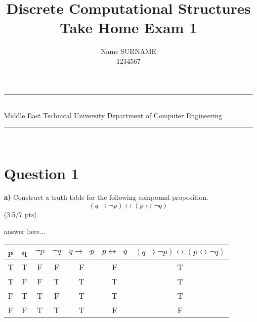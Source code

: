 \documentclass[a4paper,12pt]{article}
\title{Discrete Computational Structures \\ Take Home Exam 1}
\author{Name SURNAME \\ 1234567} %
\date{} %
\newcommand{\HRule}{\rule{\linewidth}{1mm}}
\newcommand\tab[1][1cm]{\hspace*{#1}}
\begin{document}
\HRule\\
Middle East Technical University \hfill Department of Computer Engineering
{\let\newpage\relax\maketitle}
\HRule\\
\vspace{1cm}


\section*{Question 1 \hfill {}}

\tab \textbf{a)} Construct a truth table for the following compound proposition.
\begin{equation*}
    (q \rightarrow \neg p)\leftrightarrow (p \leftrightarrow \neg q)
\end{equation*} 
\hfill \small{(3.5/7 pts)} \\
\begin{tcolorbox}
answer here...\\
\begin{tabular}{|l|c|c|c|c|c|c|}
    \hline
     p & q & $ \neg p $ & $\neg q $ & $ q\rightarrow \neg p $ & $ p \leftrightarrow \neg q $ & $ (q\rightarrow \neg p)   \leftrightarrow (p \leftrightarrow \neg q ) $ \\
    \hline \hline
    T&T&F&F&F&F&T \\
    \hline
    T&F&F&T&T&T&T \\
    \hline
    F&T&T&F&T&T&T\\
    \hline
    F&F&T&T&T&F&F\\ \hline
\end{tabular}
\vspace{1cm} %
\end{tcolorbox}
\end{document}
